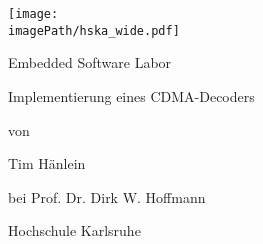 

\usepackage[a4paper, left=1cm, right=1cm, top=2cm, bottom=2cm]{geometry}


	\begin{titlepage}
		\begin{minipage}[t!][4cm][t]{0.5\textwidth}
			\texttt{[image: \\imagePath/hska\_wide.pdf]}
		\end{minipage}
	
		\begin{center}
			\vspace{1cm}
			{\Huge \ralewayLight 
			 Embedded Software Labor\par
			 Implementierung eines CDMA-Decoders\par}
			\vspace{2cm}
			{\Large \ralewayExtraLight von\par
			 Tim Hänlein\par}
			\vspace{1cm}
			{\ralewayExtraLight bei Prof. Dr. Dirk W. Hoffmann}
			\vfill
			{\ralewayExtraLight Hochschule Karlsruhe\par
		     \the\year{}}
		\end{center}
	\end{titlepage}
